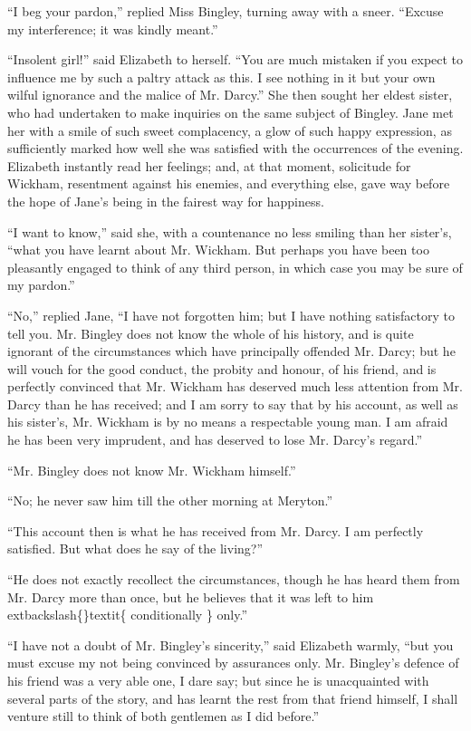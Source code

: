 \documentclass[10pt]{book}
\begin{document}
   “I beg your pardon,” replied Miss Bingley, turning away with a sneer.
“Excuse my interference; it was kindly meant.”
  

   “Insolent girl!” said Elizabeth to herself. “You are much mistaken if
you expect to influence me by such a paltry attack as this. I see
nothing in it but your own wilful ignorance and the malice of Mr.
Darcy.” She then sought her eldest sister, who had undertaken to make
inquiries on the same subject of Bingley. Jane met her with a smile of
such sweet complacency, a glow of such happy expression, as sufficiently
marked how well she was satisfied with the occurrences of the evening.
Elizabeth instantly read her feelings; and, at that moment, solicitude
for Wickham, resentment against his enemies, and everything else, gave
way before the hope of Jane’s being in the fairest way for happiness.
  

   “I want to know,” said she, with a countenance no less smiling than her
sister’s, “what you have learnt
   about Mr. Wickham. But perhaps you have
been too pleasantly engaged to think of any third person, in which case
you may be sure of my pardon.”
  

   “No,” replied Jane, “I have not forgotten him; but I have nothing
satisfactory to tell you. Mr. Bingley does not know the whole of his
history, and is quite ignorant of the circumstances which have
principally offended Mr. Darcy; but he will vouch for the good conduct,
the probity and honour, of his friend, and is perfectly convinced that
Mr. Wickham has deserved much less attention from Mr. Darcy than he has
received; and I am sorry to say that by his account, as well as his
sister’s, Mr. Wickham is by no means a respectable young man. I am
afraid he has been very imprudent, and has deserved to lose Mr. Darcy’s
regard.”
  

   “Mr. Bingley does not know Mr. Wickham himself.”
  

   “No; he never saw him till the other morning at Meryton.”
  

   “This account then is what he has received from Mr. Darcy. I am
perfectly satisfied. But what does he say of the living?”
  

   “He does not exactly recollect the circumstances, though he has heard
them from Mr. Darcy more than once, but he believes that it was left to
him
   	extbackslash\{\}textit\{
    conditionally
   \}
   only.”
  

   “I have not a doubt of Mr. Bingley’s sincerity,” said Elizabeth warmly,
“but you must excuse my not being convinced by assurances only. Mr.
Bingley’s defence of his friend was a very able one, I dare say; but
since he is unacquainted with several parts of the story, and has learnt
the rest from that friend himself, I shall venture still to think of
both gentlemen as I did before.”
  
\end{document}

